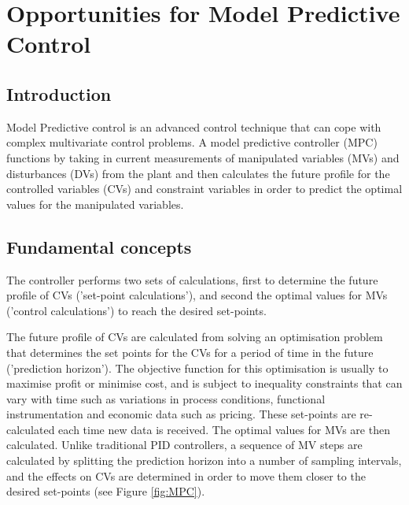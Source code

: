 \section{Opportunities for Model Predictive Control}

\subsection{Introduction}
Model Predictive control is an advanced control technique that can cope with complex multivariate control problems. A model predictive controller (MPC) functions by taking in current measurements of manipulated variables (MVs) and disturbances (DVs) from the plant and then calculates the future profile for the controlled variables (CVs) and constraint variables in order to predict the optimal values for the manipulated variables. 

\subsection{Fundamental concepts}
The controller performs two sets of calculations, first to determine the future profile of CVs ('set-point calculations'), and second the optimal values for MVs ('control calculations') to reach the desired set-points. 

The future profile of CVs are calculated from solving an optimisation problem that determines the set points for the CVs for a period of time in the future ('prediction horizon'). The objective function for this optimisation is usually to maximise profit or minimise cost, and is subject to inequality constraints that can vary with time such as variations in process conditions, functional instrumentation and economic data such as pricing. These set-points are re-calculated each time new data is received. The optimal values for MVs are then calculated. Unlike traditional PID controllers, a sequence of MV steps are calculated by splitting the prediction horizon into a number of sampling intervals, and the effects on CVs are determined in order to move them closer to the desired set-points (see Figure \ref{fig:MPC}). 

